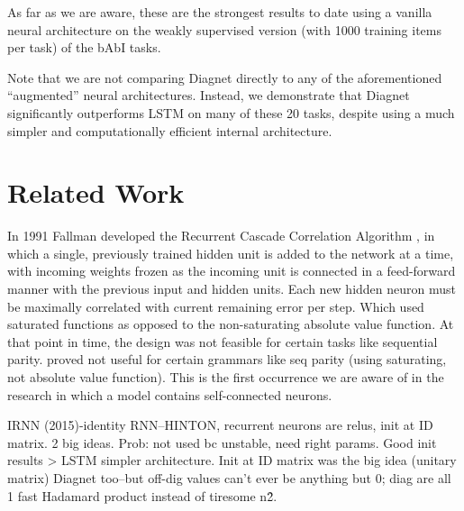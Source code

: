 \documentclass{article}
\begin{document}
As far as we are aware, these are the strongest results to date using a vanilla neural architecture on the weakly supervised version (with 1000 training items per task) of the bAbI tasks.

Note that we are not comparing Diagnet directly to any of the aforementioned “augmented” neural architectures. Instead, we demonstrate that Diagnet significantly outperforms LSTM on many of these 20 tasks, despite using a much simpler and computationally efficient internal architecture.

\section{Related Work}
\label{gen_inst}





In 1991 Fallman developed the Recurrent Cascade Correlation Algorithm \citet{Fahlman1990TheRC}, in which a single, previously trained hidden unit is added to the network at a time, with incoming weights frozen as the incoming unit is connected in a feed-forward manner with the previous input and hidden units. Each new hidden neuron must be maximally correlated with current remaining error per step.  
Which used saturated functions as opposed to the non-saturating absolute value function.  At that point in time, the design was not feasible for certain tasks like sequential parity.  proved not useful for certain grammars like seq parity (using saturating, not absolute value function). This is the first occurrence we are aware of in the research in which a model contains self-connected neurons.

IRNN (2015)-identity RNN--HINTON, recurrent neurons are relus, init at ID matrix. 2 big ideas. Prob: not used bc unstable, need right params.  Good init results > LSTM simpler architecture. Init at ID matrix was the big idea (unitary matrix) Diagnet too--but off-dig values can't ever be anything but 0; diag are all 1 fast Hadamard product instead of tiresome n\^2. 
\end{document}
